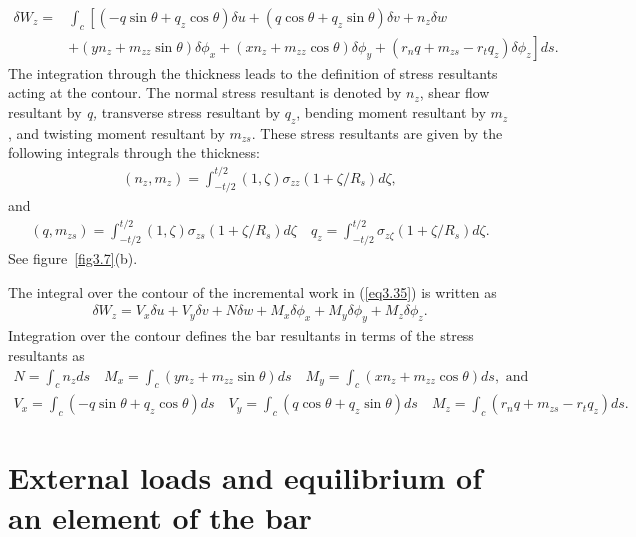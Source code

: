 \documentclass{AeroStructure-ERJohnson}
\begin{document}
\begin{align}
\delta W_{z}=& \int_{c}\left[\left(-q \sin \theta+q_{z} \cos \theta\right) \delta u+\left(q \cos \theta+q_{z} \sin \theta\right) \delta v+n_{z} \delta w\right.\nonumber\\
&+\left.\left(y n_{z}+m_{z z} \sin \theta\right) \delta \phi_{x}+\left(x n_{z}+m_{z z} \cos \theta\right) \delta \phi_{y}+\left(r_{n} q+m_{z s}-r_{t} q_{z}\right) \delta \phi_{z}\right] d s.\label{eq3.35}
\end{align}
The integration through the thickness leads to the definition of stress resultants acting at the contour. The normal stress resultant is denoted by $n_{z}$, shear flow resultant by \textit{q, }transverse stress resultant by $q_{z}$, bending moment resultant by $m_{z}$, and twisting moment resultant by $m_{z s}$. These stress resultants are given by the following integrals through the thickness:
\begin{align}\label{eq3.36}
\left(n_{z}, m_{z}\right)=\int_{-t / 2}^{t / 2}(1, \zeta) \sigma_{z z}\left(1+\zeta / R_{s}\right) d \zeta,
\end{align}
and
\begin{align}\label{eq3.37}
\left(q, m_{z s}\right)=\int_{-t / 2}^{t / 2}(1, \zeta) \sigma_{z s}\left(1+\zeta / R_{s}\right) d \zeta \quad q_{z}=\int_{-t / 2}^{t / 2} \sigma_{z \zeta}\left(1+\zeta / R_{s}\right) d \zeta.
\end{align}
See figure~\ref{fig3.7}(b).

The integral over the contour of the incremental work in (\ref{eq3.35}) is written as
\begin{align}\label{eq3.38}
\delta W_{z}=V_{x} \delta u+V_{y} \delta v+N \delta w+M_{x} \delta \phi_{x}+M_{y} \delta \phi_{y}+M_{z} \delta \phi_{z}.
\end{align}
Integration over the contour defines the bar resultants in terms of the stress resultants as
\begin{gather}
N=\int_{c} n_{z} d s \quad M_{x}=\int_{c}\left(y n_{z}+m_{z z} \sin \theta\right) d s \quad M_{y}=\int_{c}\left(x n_{z}+m_{z z} \cos \theta\right) d s,
\mbox{ and}\label{eq3.39}\\
V_{x}=\int_{c}\left(-q \sin \theta+q_{z} \cos \theta\right) d s \quad V_{y}=\int_{c}\left(q \cos \theta+q_{z} \sin \theta\right) d s \quad M_{z}=\int_{c}\left(r_{n} q+m_{z s}-r_{t} q_{z}\right) d s.\label{eq3.40}
\end{gather}



\section{External loads and equilibrium of an element of the bar}\label{sec3.6}
\end{document}

